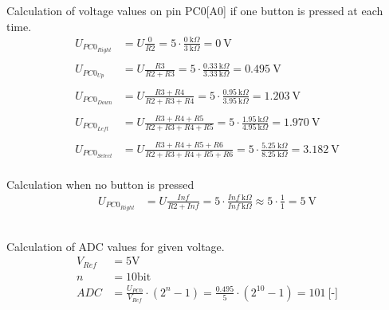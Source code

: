 \documentclass{article}
\begin{document}
\begin{flushleft}
Calculation of voltage values on pin PC0[A0] if one button is pressed at each time.
\begin{align*}
U_{PC0_{Right}}&=U\frac{0}{R2}=5\cdot \frac{0\ \textrm{k}\Omega }{3\ \textrm{k}\Omega }= 0\ \textrm{V} \\ \\
U_{PC0_{Up}}&=U\frac{R3}{R2+R3}=5\cdot \frac{0.33\ \textrm{k}\Omega }{3.33\ \textrm{k}\Omega }= 0.495\ \textrm{V} \\ \\
U_{PC0_{Down}}&=U\frac{R3+R4}{R2+R3+R4}=5\cdot \frac{0.95\ \textrm{k}\Omega }{3.95\ \textrm{k}\Omega }= 1.203\ \textrm{V} \\ \\
U_{PC0_{Left}}&=U\frac{R3+R4+R5}{R2+R3+R4+R5}=5\cdot \frac{1.95\ \textrm{k}\Omega }{4.95\ \textrm{k}\Omega }= 1.970\ \textrm{V} \\ \\
U_{PC0_{Select}}&=U\frac{R3+R4+R5+R6}{R2+R3+R4+R5+R6}=5\cdot \frac{5.25\ \textrm{k}\Omega }{8.25\ \textrm{k}\Omega }= 3.182\ \textrm{V}
\end{align*}
\\Calculation when no button is pressed
\begin{align*}
U_{PC0_{Right}}&=U\frac{Inf}{R2+Inf}=5\cdot \frac{Inf\ \textrm{k}\Omega }{Inf\ \textrm{k}\Omega }	\approx 5\cdot \frac{1}{1} = 5\ \textrm{V} \\ \\
\end{align*}
\\Calculation of ADC values for given voltage.
\begin{align*}
V_{Ref} &= 5 \textrm{V} \\
n &= 10 \textrm{bit} \\
ADC &=\frac{U_{PC0}}{V_{Ref}} \cdot (2^{n} - 1) = \frac{0.495}{5} \cdot (2^{10} - 1) = 101\ \textrm{[-]}\\
\end{align*}
\end{flushleft}
\end{document}

